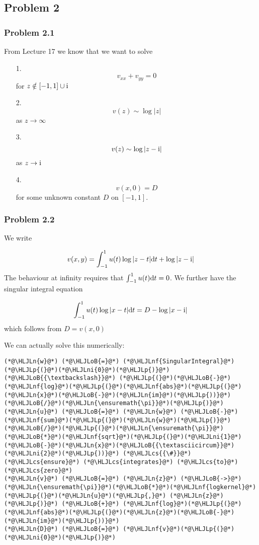 \documentclass[12pt,landscape]{article}
\newcommand{\HLJLn}[1]{#1}
\newcommand{\HLJLnf}[1]{\textcolor[RGB]{66,102,213}{#1}}
\newcommand{\HLJLni}[1]{\textcolor[RGB]{59,151,46}{#1}}
\newcommand{\HLJLoB}[1]{\textcolor[RGB]{102,102,102}{\textbf{#1}}}
\newcommand{\HLJLp}[1]{#1}
\newcommand{\HLJLcs}[1]{\textcolor[RGB]{153,153,119}{\textit{#1}}}
\def\D{ {\rm d} }
\def\I{ {\rm i} }
\def\dt{\D t}
\begin{document}
{\subsection{Problem 2}
\subsubsection{Problem 2.1}
From Lecture 17 we know that we want to solve

\begin{itemize}
\item[1. ] \[
v_{xx} + v_{yy} =0
\]
for $z \notin [-1,1] \cup \I$


\item[2. ] \[
v(z) \sim \log|z|
\]
as $z \rightarrow \infty$


\item[3. ] \[
v(z) \sim \log|z-\I|
\]
as $z \rightarrow \I$


\item[4. ] \[
v(x,0) = D
\]
for some unknown constant $D$ on $[-1,1]$.

\end{itemize}
\subsubsection{Problem 2.2}
We write

\[
v(x,y) = \int_{-1}^1 u(t) \log|z-t| \dt + \log|z-\I|
\]
The behaviour at infinity requires that $\int_{-1}^1 u(t) \dt = 0$. We further have the singular integral equation

\[
  \int_{-1}^1 u(t) \log|x-t| \dt = D - \log|x-\I|
\]
which follows from $D = v(x,0)$

We can actually solve this numerically:


\begin{lstlisting}
(*@\HLJLn{w}@*) (*@\HLJLoB{=}@*) (*@\HLJLnf{SingularIntegral}@*)(*@\HLJLp{(}@*)(*@\HLJLni{0}@*)(*@\HLJLp{)}@*) (*@\HLJLoB{{\textbackslash}}@*) (*@\HLJLp{(}@*)(*@\HLJLoB{-}@*)(*@\HLJLnf{log}@*)(*@\HLJLp{(}@*)(*@\HLJLnf{abs}@*)(*@\HLJLp{(}@*)(*@\HLJLn{x}@*)(*@\HLJLoB{-}@*)(*@\HLJLn{im}@*)(*@\HLJLp{))}@*)(*@\HLJLoB{/}@*)(*@\HLJLn{\ensuremath{\pi}}@*)(*@\HLJLp{)}@*)
(*@\HLJLn{u}@*) (*@\HLJLoB{=}@*) (*@\HLJLn{w}@*) (*@\HLJLoB{-}@*) (*@\HLJLnf{sum}@*)(*@\HLJLp{(}@*)(*@\HLJLn{w}@*)(*@\HLJLp{)}@*)(*@\HLJLoB{/}@*)(*@\HLJLp{(}@*)(*@\HLJLn{\ensuremath{\pi}}@*)(*@\HLJLoB{*}@*)(*@\HLJLnf{sqrt}@*)(*@\HLJLp{(}@*)(*@\HLJLni{1}@*)(*@\HLJLoB{-}@*)(*@\HLJLn{x}@*)(*@\HLJLoB{{\textasciicircum}}@*)(*@\HLJLni{2}@*)(*@\HLJLp{))}@*) (*@\HLJLcs{{\#}}@*) (*@\HLJLcs{ensure}@*) (*@\HLJLcs{integrates}@*) (*@\HLJLcs{to}@*) (*@\HLJLcs{zero}@*)
(*@\HLJLn{v}@*) (*@\HLJLoB{=}@*) (*@\HLJLn{z}@*) (*@\HLJLoB{->}@*) (*@\HLJLn{\ensuremath{\pi}}@*)(*@\HLJLoB{*}@*)(*@\HLJLnf{logkernel}@*)(*@\HLJLp{(}@*)(*@\HLJLn{u}@*)(*@\HLJLp{,}@*) (*@\HLJLn{z}@*)(*@\HLJLp{)}@*) (*@\HLJLoB{+}@*) (*@\HLJLnf{log}@*)(*@\HLJLp{(}@*)(*@\HLJLnf{abs}@*)(*@\HLJLp{(}@*)(*@\HLJLn{z}@*)(*@\HLJLoB{-}@*)(*@\HLJLn{im}@*)(*@\HLJLp{))}@*)
(*@\HLJLn{D}@*) (*@\HLJLoB{=}@*) (*@\HLJLnf{v}@*)(*@\HLJLp{(}@*)(*@\HLJLni{0}@*)(*@\HLJLp{)}@*)


\end{lstlisting}}
\end{document}
